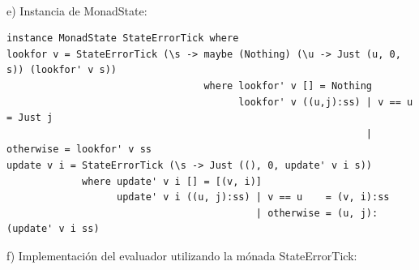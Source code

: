 \documentclass{article}
\begin{document}
\paragraph{}
e) Instancia de MonadState: 
\begin{lstlisting}
instance MonadState StateErrorTick where
lookfor v = StateErrorTick (\s -> maybe (Nothing) (\u -> Just (u, 0, s)) (lookfor' v s))
                                  where lookfor' v [] = Nothing
                                        lookfor' v ((u,j):ss) | v == u    = Just j
                                                              | otherwise = lookfor' v ss
update v i = StateErrorTick (\s -> Just ((), 0, update' v i s))
             where update' v i [] = [(v, i)]
                   update' v i ((u, j):ss) | v == u    = (v, i):ss
                                           | otherwise = (u, j):(update' v i ss)
\end{lstlisting}
\newpage
f) Implementación del evaluador utilizando la mónada StateErrorTick:
\end{document}
